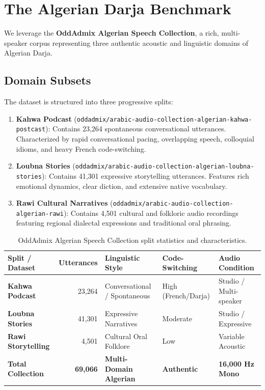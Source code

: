 \documentclass[11pt,a4paper]{article}
\begin{document}
\section{The Algerian Darja Benchmark}
\label{sec:dataset}

We leverage the \textbf{OddAdmix Algerian Speech Collection}, a rich, multi-speaker corpus representing three authentic acoustic and linguistic domains of Algerian Darja.

\subsection{Domain Subsets}
The dataset is structured into three progressive splits:
\begin{enumerate}[leftmargin=*]
    \item \textbf{Kahwa Podcast} (\texttt{oddadmix/arabic-audio-collection-algerian-kahwa-postcast}): Contains 23,264 spontaneous conversational utterances. Characterized by rapid conversational pacing, overlapping speech, colloquial idioms, and heavy French code-switching.
    \item \textbf{Loubna Stories} (\texttt{oddadmix/arabic-audio-collection-algerian-loubna-stories}): Contains 41,301 expressive storytelling utterances. Features rich emotional dynamics, clear diction, and extensive native vocabulary.
    \item \textbf{Rawi Cultural Narratives} (\texttt{oddadmix/arabic-audio-collection-algerian-rawi}): Contains 4,501 cultural and folkloric audio recordings featuring regional dialectal expressions and traditional oral phrasing.
\end{enumerate}

\begin{table}[t]
\centering
\small
\renewcommand{\arraystretch}{1.25}
\caption{OddAdmix Algerian Speech Collection split statistics and characteristics.}
\label{tab:dataset_stats}
\begin{tabularx}{\textwidth}{@{} l r >{\centering\arraybackslash}X >{\centering\arraybackslash}X >{\centering\arraybackslash}X @{}}
\toprule
\textbf{Split / Dataset} & \textbf{Utterances} & \textbf{Linguistic Style} & \textbf{Code-Switching} & \textbf{Audio Condition} \\
\midrule
\textbf{Kahwa Podcast}     & 23,264 & Conversational / Spontaneous & High (French/Darja) & Studio / Multi-speaker \\
\textbf{Loubna Stories}    & 41,301 & Expressive Narratives        & Moderate            & Studio / Expressive \\
\textbf{Rawi Storytelling} &  4,501 & Cultural Oral Folklore       & Low                 & Variable Acoustic \\
\midrule
\textbf{Total Collection}  & \textbf{69,066} & \textbf{Multi-Domain Algerian} & \textbf{Authentic} & \textbf{16,000 Hz Mono} \\
\bottomrule
\end{tabularx}
\end{table}
\end{document}
